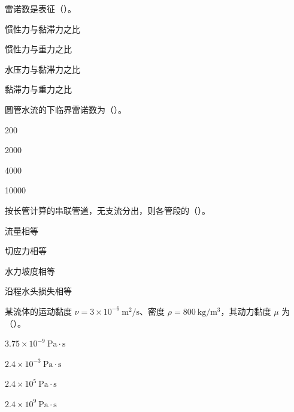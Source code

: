 \begin{ti}
\item 雷诺数是表征（\quad）。
\begin{choices}
\item 惯性力与黏滞力之比
\item 惯性力与重力之比
\item 水压力与黏滞力之比
\item 黏滞力与重力之比
\end{choices}

\item 圆管水流的下临界雷诺数为（\quad）。
\begin{choices}
\item 200
\item 2000
\item 4000
\item 10000
\end{choices}

\item 按长管计算的串联管道，无支流分出，则各管段的（\quad）。
\begin{choices}
\item 流量相等
\item 切应力相等
\item 水力坡度相等
\item 沿程水头损失相等
\end{choices}

\item 某流体的运动黏度 $\nu=3\times10^{-6}\ \mathrm{m^2/s}$、密度 $\rho=800\ \mathrm{kg/m^3}$，其动力黏度 $\mu$ 为（\quad）。
\begin{choices}
\item $3.75\times10^{-9}\ \mathrm{Pa\cdot s}$
\item $2.4\times10^{-3}\ \mathrm{Pa\cdot s}$
\item $2.4\times10^{5}\ \mathrm{Pa\cdot s}$
\item $2.4\times10^{9}\ \mathrm{Pa\cdot s}$
\end{choices}


\end{ti}
